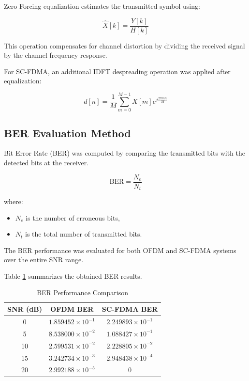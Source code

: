 Zero Forcing equalization estimates the transmitted symbol using:

\begin{equation}
\hat{X}[k]=\frac{Y[k]}{H[k]}
\end{equation}

This operation compensates for channel distortion by dividing the received
signal by the channel frequency response.

For SC-FDMA, an additional IDFT despreading operation was applied after
equalization:

\begin{equation}
d[n]=\frac{1}{M}
\sum_{m=0}^{M-1}
X[m]e^{j\frac{2\pi mn}{M}}
\end{equation}

\subsection{BER Evaluation Method}

Bit Error Rate (BER) was computed by comparing the transmitted bits with
the detected bits at the receiver.

\begin{equation}
\mathrm{BER}
=
\frac{N_e}{N_t}
\end{equation}

where:
\begin{itemize}
    \item $N_e$ is the number of erroneous bits,
    \item $N_t$ is the total number of transmitted bits.
\end{itemize}

The BER performance was evaluated for both OFDM and SC-FDMA systems over
the entire SNR range.

Table \ref{tab:ber_results} summarizes the obtained BER results.

\begin{table}[H]
\centering
\caption{BER Performance Comparison}
\label{tab:ber_results}
\begin{tabular}{|c|c|c|}
\hline
\textbf{SNR (dB)} & \textbf{OFDM BER} & \textbf{SC-FDMA BER} \\ \hline

0  & $1.859452\times10^{-1}$ & $2.249893\times10^{-1}$ \\ \hline
5  & $8.538000\times10^{-2}$ & $1.088427\times10^{-1}$ \\ \hline
10 & $2.599531\times10^{-2}$ & $2.228805\times10^{-2}$ \\ \hline
15 & $3.242734\times10^{-3}$ & $2.948438\times10^{-4}$ \\ \hline
20 & $2.992188\times10^{-5}$ & $0$ \\ \hline

\end{tabular}
\end{table}

